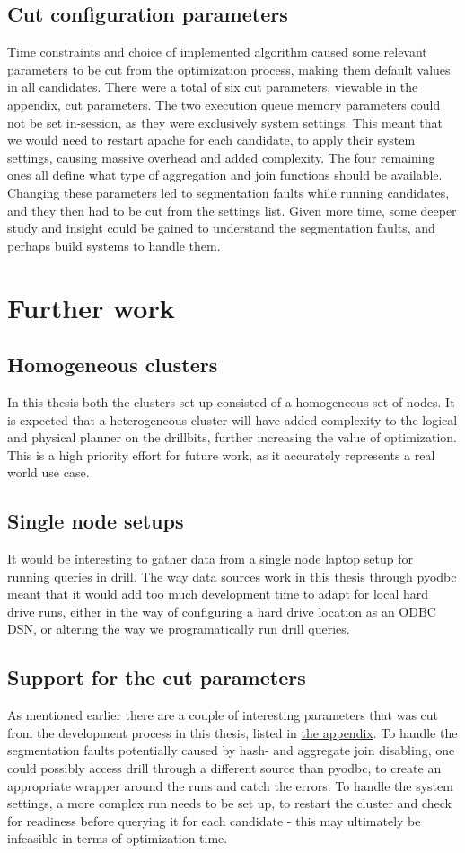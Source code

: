 \documentclass[a4paper,english]{report}
\begin{document}
	\section{Cut configuration parameters}
	Time constraints and choice of implemented algorithm caused some relevant parameters to be cut from the optimization process, making them default values in all candidates. There were a total of six cut parameters, viewable in the appendix, \hyperref[table:removed_params]{cut parameters}. The two execution queue memory parameters could not be set in-session, as they were exclusively system settings. This meant that we would need to restart apache for each candidate, to apply their system settings, causing massive overhead and added complexity. The four remaining ones all define what type of aggregation and join functions should be available. Changing these parameters led to segmentation faults while running candidates, and they then had to be cut from the settings list. Given more time, some deeper study and insight could be gained to understand the segmentation faults, and perhaps build systems to handle them.
	
	\chapter{Further work}
	\section{Homogeneous clusters}
	In this thesis both the clusters set up consisted of a homogeneous set of nodes. It is expected that a heterogeneous cluster will have added complexity to the logical and physical planner on the drillbits, further increasing the value of optimization. This is a high priority effort for future work, as it accurately represents a real world use case.
	\section{Single node setups}
	It would be interesting to gather data from a single node laptop setup for running queries in drill. The way data sources work in this thesis through pyodbc meant that it would add too much development time to adapt for local hard drive runs, either in the way of configuring a hard drive location as an ODBC DSN, or altering the way we programatically run drill queries. 
	\section{Support for the cut parameters}
	As mentioned earlier there are a couple of interesting parameters that was cut from the development process in this thesis, listed in \hyperref[table:removed_params]{the appendix}. To handle the segmentation faults potentially caused by hash- and aggregate join disabling, one could possibly access drill through a different source than pyodbc, to create an appropriate wrapper around the runs and catch the errors. To handle the system settings, a more complex run needs to be set up, to restart the cluster and check for readiness before querying it for each candidate - this may ultimately be infeasible in terms of optimization time.
	
\end{document}
